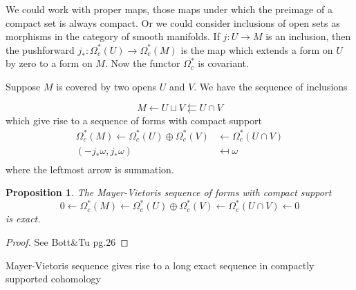 \documentclass[12pt]{amsart}
\newtheorem{proposition}{Proposition}
\theoremstyle{remark}
\begin{document}
We could work with proper maps, those maps under which the preimage of a compact set is always compact. Or we could consider inclusions of open sets as morphisms in the category of smooth manifolds. If $j:U \to M$ is an inclusion, then the pushforward $j_{*}:\Omega_c^{*}(U)\to \Omega_c^{*}(M)$ is the map which extends a form on $U$ by zero to a form on $M$. Now the functor $\Omega_c^{*}$ is covariant.

Suppose $M$ is covered by two opens $U$ and $V$. We have the sequence of inclusions 

\begin{equation*}
    M \leftarrow U \sqcup V \leftleftarrows U\cap V
\end{equation*}
which give rise to a sequence of forms with compact support 
\begin{align*}
    \Omega_c^{*}(M) \leftarrow  \Omega_c^{*}(U) \oplus\Omega_c^{*}(V) &\leftarrow \Omega_c^{*}(U\cap V)\\
    (-j_*\omega,j_*\omega) &\mapsfrom \omega\\
\end{align*}
where the leftmost arrow is summation.
\begin{proposition}
The Mayer-Vietoris sequence of forms with compact support
\begin{equation*}
     0\leftarrow \Omega_c^{*}(M) \leftarrow  \Omega_c^{*}(U) \oplus\Omega_c^{*}(V) \leftarrow \Omega_c^{*}(U\cap V) \leftarrow0 
\end{equation*}
   is exact.
\end{proposition}
\begin{proof}
    See Bott\&Tu pg.26
\end{proof}
Mayer-Vietoris sequence gives rise to a long exact sequence in compactly supported cohomology \\

\end{document}
